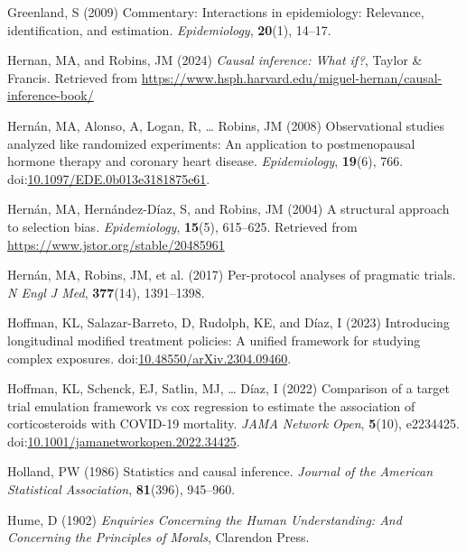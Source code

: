 \documentclass[
  single column]{article}
\newlength{\cslhangindent}
\newenvironment{CSLReferences}[2] %
 {\begin{list}{}{%
  \setlength{\itemindent}{0pt}
  \setlength{\leftmargin}{0pt}
  \setlength{\parsep}{0pt}
  \ifodd #1
   \setlength{\leftmargin}{\cslhangindent}
   \setlength{\itemindent}{-1\cslhangindent}
  \fi
  \setlength{\itemsep}{#2\baselineskip}}}
 {\end{list}}
\begin{document}
\begin{CSLReferences}{1}{0}
Greenland, S (2009) Commentary: Interactions in epidemiology: Relevance,
identification, and estimation. \emph{Epidemiology}, \textbf{20}(1),
14--17.

Hernan, MA, and Robins, JM (2024) \emph{Causal inference: What if?},
Taylor \& Francis. Retrieved from
\url{https://www.hsph.harvard.edu/miguel-hernan/causal-inference-book/}

Hernán, MA, Alonso, A, Logan, R, \ldots{} Robins, JM (2008)
Observational studies analyzed like randomized experiments: An
application to postmenopausal hormone therapy and coronary heart
disease. \emph{Epidemiology}, \textbf{19}(6), 766.
doi:\href{https://doi.org/10.1097/EDE.0b013e3181875e61}{10.1097/EDE.0b013e3181875e61}.

Hernán, MA, Hernández-Díaz, S, and Robins, JM (2004) A structural
approach to selection bias. \emph{Epidemiology}, \textbf{15}(5),
615--625. Retrieved from \url{https://www.jstor.org/stable/20485961}

Hernán, MA, Robins, JM, et al. (2017) Per-protocol analyses of pragmatic
trials. \emph{N Engl J Med}, \textbf{377}(14), 1391--1398.

Hoffman, KL, Salazar-Barreto, D, Rudolph, KE, and Díaz, I (2023)
Introducing longitudinal modified treatment policies: A unified
framework for studying complex exposures.
doi:\href{https://doi.org/10.48550/arXiv.2304.09460}{10.48550/arXiv.2304.09460}.

Hoffman, KL, Schenck, EJ, Satlin, MJ, \ldots{} Díaz, I (2022) Comparison
of a target trial emulation framework vs cox regression to estimate the
association of corticosteroids with COVID-19 mortality. \emph{JAMA
Network Open}, \textbf{5}(10), e2234425.
doi:\href{https://doi.org/10.1001/jamanetworkopen.2022.34425}{10.1001/jamanetworkopen.2022.34425}.

Holland, PW (1986) Statistics and causal inference. \emph{Journal of the
American Statistical Association}, \textbf{81}(396), 945--960.

Hume, D (1902) \emph{Enquiries Concerning the Human Understanding: And
Concerning the Principles of Morals}, Clarendon Press.


\end{CSLReferences}
\end{document}
